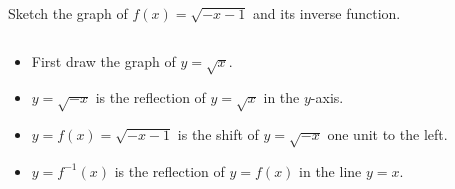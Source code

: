 \begin{frame}
\begin{example}
\begin{columns}[c]
{}%
Sketch the graph of $f(x) = \sqrt{-x - 1}$ and its inverse function.
\end{columns}
\begin{itemize}
\item<2->  First draw the graph of $y = \sqrt{x}$.
\item<3->  $y = \sqrt{-x}$ is the reflection of $y = \sqrt{x}$ in the $y$-axis.
\item<4->  $y = f(x) = \sqrt{-x - 1}$ is the shift of $y = \sqrt{-x}$ one unit to the left.
\item<5->  $y = f^{-1}(x)$ is the reflection of $y = f(x)$ in the line $y = x$.
\end{itemize}
\end{example}
\end{frame}

